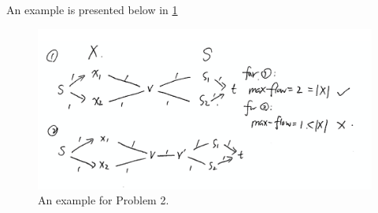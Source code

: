 \begin{exercise}[]
\begin{solution}
\begin{enumerate}
    An example is presented below in \ref{fig:ans}\begin{figure}[h]
      \centering
      \includegraphics[width=0.5\linewidth]{img/ex5-2.png}
      \caption{An example for Problem 2.}
      \label{fig:ans}
  \end{figure}
  \end{enumerate}
  \end{solution}
  \label{ex2}
\end{exercise}


